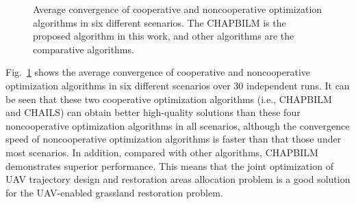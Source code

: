 \documentclass[preprint,5pt]{elsarticle}
\begin{document}
\begin{figure}[htb]
{    }
\caption{Average convergence of cooperative and noncooperative optimization algorithms in six different scenarios.  The CHAPBILM is the proposed algorithm in this work, and other algorithms are the comparative algorithms.} \label{Convergence}
\end{figure}
Fig.~\ref{Convergence} shows the average convergence of cooperative and noncooperative optimization algorithms in six different scenarios over 30 independent runs. It can be seen that these two cooperative optimization algorithms (i.e., CHAPBILM and CHAILS) can obtain better high-quality solutions than these four noncooperative optimization algorithms in all scenarios, although the convergence speed of noncooperative optimization algorithms is faster than that those under most scenarios. In addition, compared with other algorithms, CHAPBILM demonstrates superior performance.
This means that the joint optimization of UAV trajectory design and restoration areas allocation problem is a good solution for the UAV-enabled grassland restoration problem.
\end{document}
